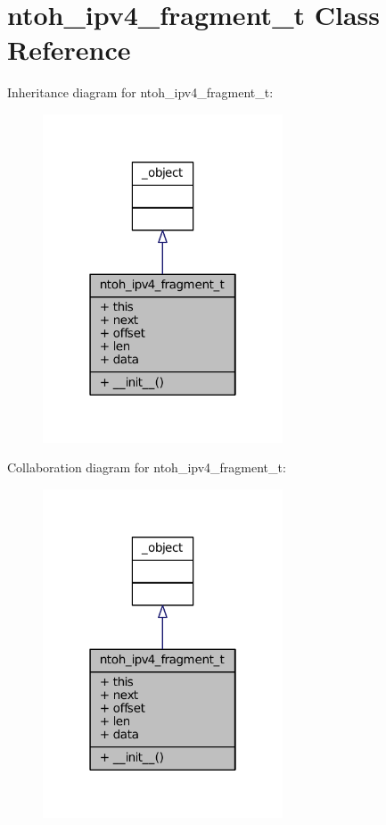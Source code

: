 \hypertarget{classlibntoh_1_1ntoh__ipv4__fragment__t}{\section{ntoh\-\_\-ipv4\-\_\-fragment\-\_\-t Class Reference}
\label{classlibntoh_1_1ntoh__ipv4__fragment__t}
}


Inheritance diagram for ntoh\-\_\-ipv4\-\_\-fragment\-\_\-t\-:
\nopagebreak
\begin{figure}[H]
\begin{center}
\leavevmode
\includegraphics[width=202pt]{classlibntoh_1_1ntoh__ipv4__fragment__t__inherit__graph}
\end{center}
\end{figure}


Collaboration diagram for ntoh\-\_\-ipv4\-\_\-fragment\-\_\-t\-:
\nopagebreak
\begin{figure}[H]
\begin{center}
\leavevmode
\includegraphics[width=202pt]{classlibntoh_1_1ntoh__ipv4__fragment__t__coll__graph}
\end{center}
\end{figure}
